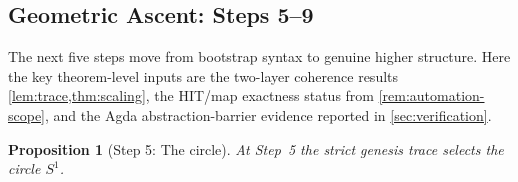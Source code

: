 \documentclass[11pt,a4paper]{article}
\theoremstyle{plain}
\newtheorem{proposition}[theorem]{Proposition}
\theoremstyle{definition}
\theoremstyle{remark}
\begin{document}
\subsection{Geometric Ascent: Steps 5--9}
\label{subsec:genesis-geometric-proof}

The next five steps move from bootstrap syntax to genuine higher structure.
Here the key theorem-level inputs are the two-layer coherence results
\cref{lem:trace,thm:scaling}, the HIT/map exactness status from
\cref{rem:automation-scope}, and the Agda abstraction-barrier evidence reported
in \cref{sec:verification}.

\begin{proposition}[Step 5: The circle]
\label{prop:genesis-step5}
At Step~5 the strict genesis trace selects the circle $S^1$.
\end{proposition}
\end{document}
